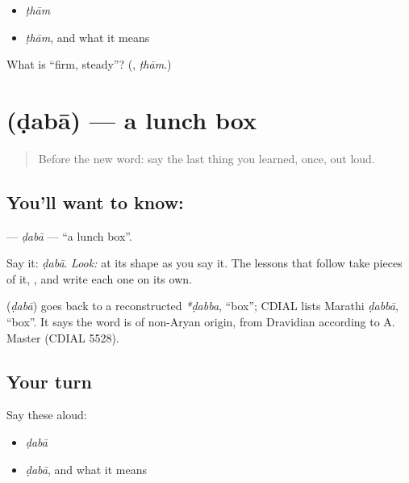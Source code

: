 \begin{itemize}
\raggedright
  \item \emph{ṭhām}
  \item \emph{ṭhām}, and what it means
\end{itemize}

\begin{tcolorbox}[breakable,colback=teal!4,colframe=teal!35!black,title={Before you move on}]
What is \textquotedblleft{}firm, steady\textquotedblright{}? (\textbf{}, \emph{ṭhām}.)
\end{tcolorbox}
\section[\texorpdfstring{\mr{डबा} (ḍabā)}{डबा (ḍabā)}]{ (ḍabā) — a lunch box}

\label{lesson:MR-C07-daba}



\begin{quote}
Before the new word: say the last thing you learned, once, out loud.
\end{quote}

\subsection*{You'll want to know: }
\textbf{} — \emph{ḍabā} — \textquotedblleft{}a lunch box\textquotedblright{}.

Say it: \emph{ḍabā}. \emph{Look:} at its shape as you say it. The lessons that follow take pieces of it, \textbf{}, and write each one on its own.

\begin{cousinweb}
\textbf{} (\emph{ḍabā}) goes back to a reconstructed \emph{*ḍabba}, \textquotedblleft{}box\textquotedblright{}; CDIAL lists Marathi \emph{ḍabbā}, \textquotedblleft{}box\textquotedblright{}. It says the word is of non-Aryan origin, from Dravidian according to A. Master (CDIAL 5528).
\end{cousinweb}

\subsection*{Your turn}
Say these aloud:

\begin{itemize}
\raggedright
  \item \emph{ḍabā}
  \item \emph{ḍabā}, and what it means
\end{itemize}

